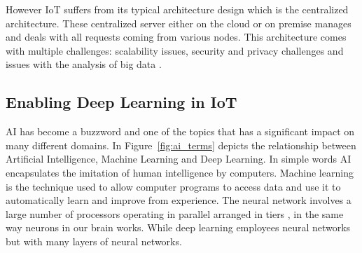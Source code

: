 However IoT suffers from its typical architecture design which is the centralized architecture. These centralized server either on the cloud or on premise manages and deals with all requests coming from various nodes. This architecture comes with multiple challenges: scalability issues, security and privacy challenges and issues with the analysis of big data \cite{8627114}. 

\subsection{Enabling Deep Learning in IoT}
AI has become a buzzword and one of the topics that has a significant impact on many different domains. In Figure~\ref{fig:ai_terms} depicts the relationship between Artificial Intelligence, Machine Learning and Deep Learning. In simple words AI encapsulates the imitation of human intelligence by computers. Machine learning is the technique used to allow computer programs to access data and use it to automatically learn and improve from experience. The neural network involves a large number of processors operating in parallel arranged in tiers , in the same way neurons in our brain works. While deep learning employees neural networks but with many layers of neural networks. 


